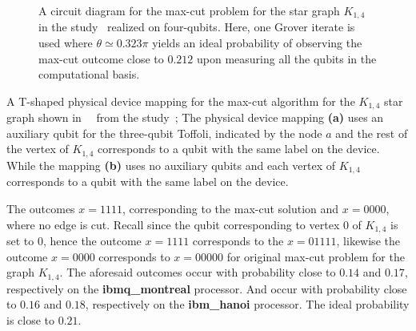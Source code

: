 \clearpage

\begin{figure}[t!]
	\centering
	\caption[A circuit diagram for the \acs{max-cut} problem in the study~\cite{Satoh_2020} realized on four-qubits.]{A circuit diagram for the \acs{max-cut} problem for the star graph $K_{1,4}$ in the study~\cite{Satoh_2020} realized on four-qubits. Here, one Grover iterate is used where ${\theta\simeq 0.323\pi}$ yields an ideal probability of observing the \acs{max-cut} outcome close to $0.212$ upon measuring all the qubits in the computational basis.}
\end{figure}

\begin{marginfigure}[-10pt]
	\centering
    \caption[A T-shaped physical device mappings for the \acs{max-cut} algorithm for the $K_{1,4}$ star graph.]{A T-shaped physical device mapping for the \acs{max-cut} algorithm for the $K_{1,4}$ star graph shown in~\protect{}~\protect{} from the study~\cite{Satoh_2020}; The physical device mapping \textbf{(a)} uses an auxiliary qubit for the three-qubit Toffoli, indicated by the node $a$ and the rest of the vertex of $K_{1,4}$ corresponds to a qubit with the same label on the device. While the mapping \textbf{(b)} uses no auxiliary qubits and each vertex of $K_{1,4}$ corresponds to a qubit with the same label on the device.}
\end{marginfigure}

\noindent
The outcomes $x=1111$, corresponding to the \acs{max-cut} solution and $x=0000$, where no edge is cut. Recall since the qubit corresponding to vertex $0$ of $K_{1,4}$ is set to $0$, hence the outcome $x=1111$ corresponds to the $x=01111$, likewise the outcome $x=0000$ corresponds to $x=00000$ for original \acs{max-cut} problem for the graph $K_{1,4}$. The aforesaid outcomes occur with probability close to $0.14$ and $0.17$, respectively on the \textbf{ibmq\_montreal} processor. And occur with probability close to $0.16$ and $0.18$, respectively on the \textbf{ibm\_hanoi} processor. The ideal probability is close to $0.21$. 

